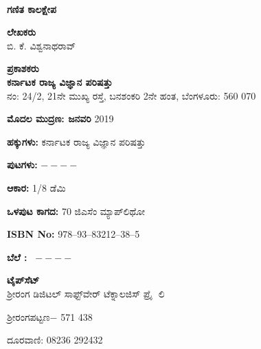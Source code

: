 ~
\thispagestyle{empty}

\vfill

\begin{center}
{\Large\bfseries ಗಣಿತ ಕಾಲಕ್ಷೇಪ}\\

\smallskip
\smallskip
\smallskip

{\bfseries ಲೇಖಕರು}\\[0.1cm]
ಬಿ. ಕೆ. ವಿಶ್ವನಾಥರಾವ್\\


\vfill

\smallskip

{\bfseries ಪ್ರಕಾಶಕರು}\\[0.1cm]
{\large\bfseries ಕರ್ನಾಟಕ ರಾಜ್ಯ ವಿಜ್ಞಾನ ಪರಿಷತ್ತು}\\
ನಂ: {\rm 24/2}, {\rm 21}ನೇ ಮುಖ್ಯ ರಸ್ತೆ, ಬನಶಂಕರಿ {\rm 2}ನೇ ಹಂತ, ಬೆಂಗಳೂರು: {\rm 560 070}
\end{center}

\vfill

\begin{center}
{\bfseries ಮೊದಲ ಮುದ್ರಣ: ಜನವರಿ} {\rm 2019}

\vfill

{\bfseries ಹಕ್ಕುಗಳು:} ಕರ್ನಾಟಕ ರಾಜ್ಯ ವಿಜ್ಞಾನ ಪರಿಷತ್ತು 

\vfill

{\bfseries ಪುಟಗಳು:} {\rm $----$}

\vfill

{\bfseries ಆಕಾರ:} {\rm 1/8} ಡೆಮಿ

\vfill

{\bfseries ಒಳಪುಟ ಕಾಗದ:} {\rm 70} ಜಿಎಸೆಂ ಮ್ಯಾಪ್‌ಲಿಥೋ 

\vfill

 {\rm {\bfseries ISBN No:}} {\rm 978$–$93$–$83212$–$38$–$5}

\vfill


{\bfseries ಬೆಲೆ :} \rupee \ {\rm $----$}

\vfill

{\bfseries ಟೈಪ್‌ಸೆಟ್}\\
 ಶ್ರೀರಂಗ ಡಿಜಿಟಲ್ ಸಾಫ್ಟ್‌ವೇರ್ ಟೆಕ್ನಾಲಜಿಸ್ ಪ್ರೈ $\;$ಲಿ 

ಶ್ರೀರಂಗಪಟ್ಟಣ$-$ {\rm 571 438}

\smallskip

ದೂರವಾಣಿ: {\rm 08236 292432}

\vfill

\end{center}
